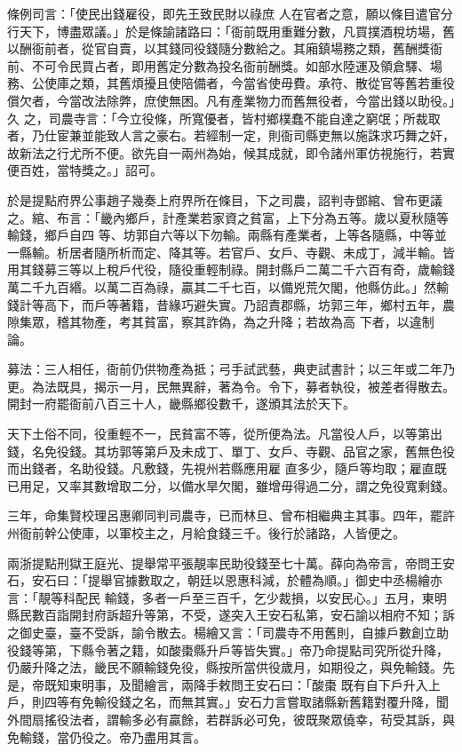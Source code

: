 \begin{pinyinscope}
 條例司言：「使民出錢雇役，即先王致民財以祿庶
 人在官者之意，願以條目遣官分行天下，博盡眾議。」於是條諭諸路曰：「衙前既用重難分數，凡買撲酒稅坊場，舊以酬衙前者，從官自賣，以其錢同役錢隨分數給之。其廂鎮場務之類，舊酬獎衙前、不可令民買占者，即用舊定分數為投名衙前酬獎。如部水陸運及領倉驛、場務、公使庫之類，其舊煩擾且使陪備者，今當省使毋費。承符、散從官等舊若重役償欠者，今當改法除弊，庶使無困。凡有產業物力而舊無役者，今當出錢以助役。」久
 之，司農寺言：「今立役條，所寬優者，皆村鄉樸蠢不能自達之窮氓；所裁取者，乃仕宦兼並能致人言之豪右。若經制一定，則衙司縣吏無以施誅求巧舞之奸，故新法之行尤所不便。欲先自一兩州為始，候其成就，即令諸州軍仿視施行，若實便百姓，當特獎之。」詔可。



 於是提點府界公事趙子幾奏上府界所在條目，下之司農，詔判寺鄧綰、曾布更議之。綰、布言：「畿內鄉戶，計產業若家資之貧富，上下分為五等。歲以夏秋隨等輸錢，鄉戶自四
 等、坊郭自六等以下勿輸。兩縣有產業者，上等各隨縣，中等並一縣輸。析居者隨所析而定、降其等。若官戶、女戶、寺觀、未成丁，減半輸。皆用其錢募三等以上稅戶代役，隨役重輕制祿。開封縣戶二萬二千六百有奇，歲輸錢萬二千九百緡。以萬二百為祿，贏其二千七百，以備兇荒欠閣，他縣仿此。」然輸錢計等高下，而戶等著籍，昔緣巧避失實。乃詔責郡縣，坊郭三年，鄉村五年，農隙集眾，稽其物產，考其貧富，察其詐偽，為之升降；若故為高
 下者，以違制論。



 募法：三人相任，衙前仍供物產為抵；弓手試武藝，典吏試書計；以三年或二年乃更。為法既具，揭示一月，民無異辭，著為令。令下，募者執役，被差者得散去。開封一府罷衙前八百三十人，畿縣鄉役數千，遂頒其法於天下。



 天下土俗不同，役重輕不一，民貧富不等，從所便為法。凡當役人戶，以等第出錢，名免役錢。其坊郭等第戶及未成丁、單丁、女戶、寺觀、品官之家，舊無色役而出錢者，名助役錢。凡敷錢，先視州若縣應用雇
 直多少，隨戶等均取；雇直既已用足，又率其數增取二分，以備水旱欠閣，雖增毋得過二分，謂之免役寬剩錢。



 三年，命集賢校理呂惠卿同判司農寺，已而林旦、曾布相繼典主其事。四年，罷許州衙前幹公使庫，以軍校主之，月給食錢三千。後行於諸路，人皆便之。



 兩浙提點刑獄王庭光、提舉常平張靚率民助役錢至七十萬。薛向為帝言，帝問王安石，安石曰：「提舉官據數取之，朝廷以恩惠科減，於體為順。」御史中丞楊繪亦言：「靚等科配民
 輸錢，多者一戶至三百千，乞少裁損，以安民心。」五月，東明縣民數百詣開封府訴超升等第，不受，遂突入王安石私第，安石諭以相府不知；訴之御史臺，臺不受訴，諭令散去。楊繪又言：「司農寺不用舊則，自據戶數創立助役錢等第，下縣令著之籍，如酸棗縣升戶等皆失實。」帝乃命提點司究所從升降，仍嚴升降之法，畿民不願輸錢免役，縣按所當供役歲月，如期役之，與免輸錢。先是，帝既知東明事，及聞繪言，兩降手敕問王安石曰：「酸棗
 既有自下戶升入上戶，則四等有免輸役錢之名，而無其實。」安石力言嘗取諸縣新舊籍對覆升降，聞外間扇搖役法者，謂輸多必有贏餘，若群訴必可免，彼既聚眾僥幸，茍受其訴，與免輸錢，當仍役之。帝乃盡用其言。




\end{pinyinscope}
